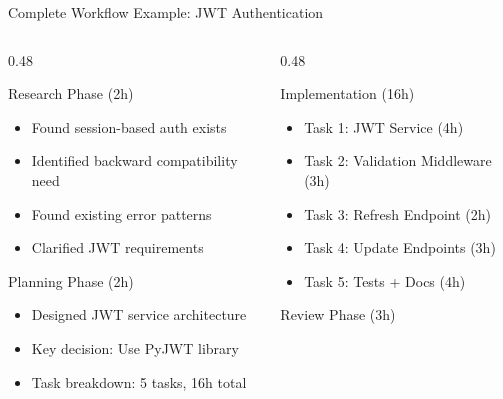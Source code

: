 \documentclass[aspectratio=169,10pt]{beamer}
\begin{document}
\begin{frame}{Complete Workflow Example: JWT Authentication}
    \begin{columns}[T]
        \begin{column}{0.48\textwidth}
            \begin{exampleblock}{Research Phase (2h)}
                \begin{itemize}
                    \item Found session-based auth exists
                    \item Identified backward compatibility need
                    \item Found existing error patterns
                    \item Clarified JWT requirements
                \end{itemize}
            \end{exampleblock}
            \begin{exampleblock}{Planning Phase (2h)}
                \begin{itemize}
                    \item Designed JWT service architecture
                    \item Key decision: Use PyJWT library
                    \item Task breakdown: 5 tasks, 16h total
                \end{itemize}
            \end{exampleblock}
        \end{column}
        \begin{column}{0.48\textwidth}
            \begin{exampleblock}{Implementation (16h)}
                \begin{itemize}
                    \item Task 1: JWT Service (4h) \checkmark
                    \item Task 2: Validation Middleware (3h) \checkmark
                    \item Task 3: Refresh Endpoint (2h) \checkmark
                    \item Task 4: Update Endpoints (3h) \checkmark
                    \item Task 5: Tests + Docs (4h) \checkmark
                \end{itemize}
            \end{exampleblock}
            \begin{exampleblock}{Review Phase (3h)}

\end{exampleblock}
\end{column}
\end{columns}
\end{frame}
\end{document}
